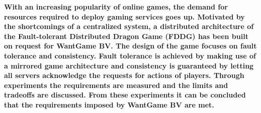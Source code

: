 \textbf{With an increasing popularity of online games, the demand for resources required to deploy gaming services goes up.
	Motivated by the shortcomings of a centralized system, a distributed architecture of the Fault-tolerant Distributed Dragon Game (FDDG) has been built on request for WantGame BV. 
	The design of the game focuses on fault tolerance and consistency.
	Fault tolerance is achieved by making use of a mirrored game architecture and consistency is guaranteed by letting all servers acknowledge the requests for actions of players. 
	Through experiments the requirements are measured and the limits and tradeoffs are discussed.
	From these experiments it can be concluded that the requirements imposed by WantGame BV are met.}